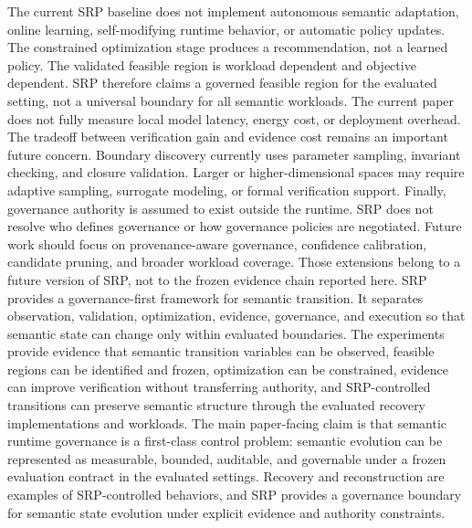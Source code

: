 {}
\markdownRendererSectionEnd 
\markdownRendererSectionEnd \markdownRendererSectionBegin
{}\markdownRendererInterblockSeparator
{}The current SRP baseline does not implement autonomous semantic adaptation, online learning, self-modifying runtime behavior, or automatic policy updates. The constrained optimization stage produces a recommendation, not a learned policy.\markdownRendererParagraphSeparator
{}The validated feasible region is workload dependent and objective dependent. SRP therefore claims a governed feasible region for the evaluated setting, not a universal boundary for all semantic workloads.\markdownRendererParagraphSeparator
{}The current paper does not fully measure local model latency, energy cost, or deployment overhead. The tradeoff between verification gain and evidence cost remains an important future concern.\markdownRendererParagraphSeparator
{}Boundary discovery currently uses parameter sampling, invariant checking, and closure validation. Larger or higher-dimensional spaces may require adaptive sampling, surrogate modeling, or formal verification support.\markdownRendererParagraphSeparator
{}Finally, governance authority is assumed to exist outside the runtime. SRP does not resolve who defines governance or how governance policies are negotiated.\markdownRendererParagraphSeparator
{}Future work should focus on provenance-aware governance, confidence calibration, candidate pruning, and broader workload coverage. Those extensions belong to a future version of SRP, not to the frozen evidence chain reported here.\markdownRendererInterblockSeparator
{}
\markdownRendererSectionEnd \markdownRendererSectionBegin
{}\markdownRendererInterblockSeparator
{}SRP provides a governance-first framework for semantic transition. It separates observation, validation, optimization, evidence, governance, and execution so that semantic state can change only within evaluated boundaries. The experiments provide evidence that semantic transition variables can be observed, feasible regions can be identified and frozen, optimization can be constrained, evidence can improve verification without transferring authority, and SRP-controlled transitions can preserve semantic structure through the evaluated recovery implementations and workloads.\markdownRendererParagraphSeparator
{}The main paper-facing claim is that semantic runtime governance is a first-class control problem: semantic evolution can be represented as measurable, bounded, auditable, and governable under a frozen evaluation contract in the evaluated settings. Recovery and reconstruction are examples of SRP-controlled behaviors, and SRP provides a governance boundary for semantic state evolution under explicit evidence and authority constraints.\markdownRendererInterblockSeparator
